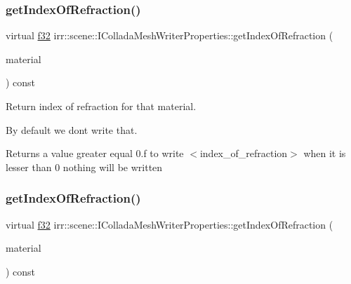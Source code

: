 \subsubsection{\texorpdfstring{get\+Index\+Of\+Refraction()}{getIndexOfRefraction()}\hspace{0.1cm}{\footnotesize\ttfamily [1/2]}}
{\footnotesize\ttfamily virtual \hyperlink{namespaceirr_a0277be98d67dc26ff93b1a6a1d086b07}{f32} irr\+::scene\+::\+I\+Collada\+Mesh\+Writer\+Properties\+::get\+Index\+Of\+Refraction (\begin{DoxyParamCaption}\item[{const \hyperlink{classirr_1_1video_1_1SMaterial}{video\+::\+S\+Material} \&}]{material }\end{DoxyParamCaption}) const\hspace{0.3cm}{\ttfamily [pure virtual]}}



Return index of refraction for that material. 

By default we don\textquotesingle{}t write that. \begin{DoxyReturn}{Returns}
a value greater equal 0.\+f to write $<$index\+\_\+of\+\_\+refraction$>$ when it is lesser than 0 nothing will be written 
\end{DoxyReturn}
\mbox{\label{classirr_1_1scene_1_1IColladaMeshWriterProperties_ab7ec58f708ebebe941246e6c78b0691d}} 
\subsubsection{\texorpdfstring{get\+Index\+Of\+Refraction()}{getIndexOfRefraction()}\hspace{0.1cm}{\footnotesize\ttfamily [2/2]}}
{\footnotesize\ttfamily virtual \hyperlink{namespaceirr_a0277be98d67dc26ff93b1a6a1d086b07}{f32} irr\+::scene\+::\+I\+Collada\+Mesh\+Writer\+Properties\+::get\+Index\+Of\+Refraction (\begin{DoxyParamCaption}\item[{const \hyperlink{classirr_1_1video_1_1SMaterial}{video\+::\+S\+Material} \&}]{material }\end{DoxyParamCaption}) const\hspace{0.3cm}{\ttfamily [pure virtual]}}



